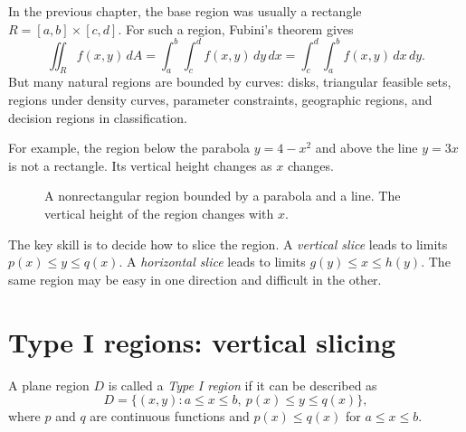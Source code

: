\documentclass[11pt]{article}
\begin{document}
In the previous chapter, the base region was usually a rectangle $R=[a,b]\times[c,d]$. For such a region, Fubini's theorem gives
\[
\iint_R f(x,y)\,dA
=\int_a^b\int_c^d f(x,y)\,dy\,dx
=\int_c^d\int_a^b f(x,y)\,dx\,dy.
\]
But many natural regions are bounded by curves: disks, triangular feasible sets, regions under density curves, parameter constraints, geographic regions, and decision regions in classification.

For example, the region below the parabola $y=4-x^2$ and above the line $y=3x$ is not a rectangle. Its vertical height changes as $x$ changes.

\begin{figure}[H]
\centering
{}
\caption{A nonrectangular region bounded by a parabola and a line. The vertical height of the region changes with $x$.}
\end{figure}

The key skill is to decide how to slice the region. A \emph{vertical slice} leads to limits $p(x)\le y\le q(x)$. A \emph{horizontal slice} leads to limits $g(y)\le x\le h(y)$. The same region may be easy in one direction and difficult in the other.

\section{Type I regions: vertical slicing}

A plane region $D$ is called a \emph{Type I region} if it can be described as
\[
D=\{(x,y):a\le x\le b,\ p(x)\le y\le q(x)\},
\]
where $p$ and $q$ are continuous functions and $p(x)\le q(x)$ for $a\le x\le b$.
\end{document}
